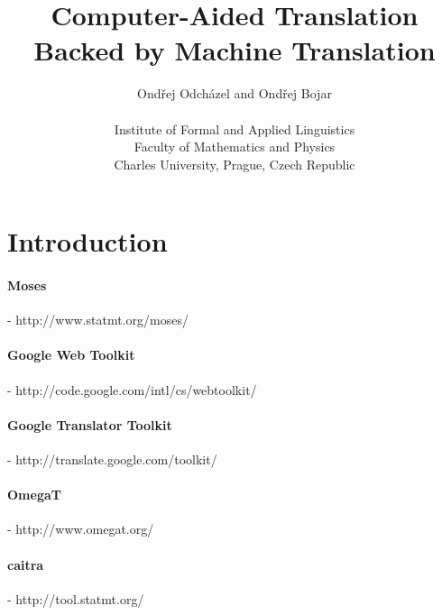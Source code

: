 \setlength{\topmargin}{-.5in}
\setlength{\textheight}{9in}
\setlength{\oddsidemargin}{.125in}
\setlength{\textwidth}{6.25in}

\title{\textbf{Computer-Aided Translation Backed by Machine Translation}}
\author{Ond\v{r}ej Odch\'{a}zel and Ond\v{r}ej Bojar\\\\
Institute of Formal and Applied Linguistics\\
Faculty of Mathematics and Physics\\
Charles University, Prague, Czech Republic}

\renewcommand{\today}{June 30, 2009}
\maketitle

\def\footurl#1{\footnote{\tt{} #1}}
\def\equo#1{``#1''}

\section {Introduction}


 

\paragraph{Moses} - http://www.statmt.org/moses/
\paragraph{Google Web Toolkit} - http://code.google.com/intl/cs/webtoolkit/
\paragraph{Google Translator Toolkit} - http://translate.google.com/toolkit/
\paragraph{OmegaT} - http://www.omegat.org/
\paragraph{caitra} - http://tool.statmt.org/

 
